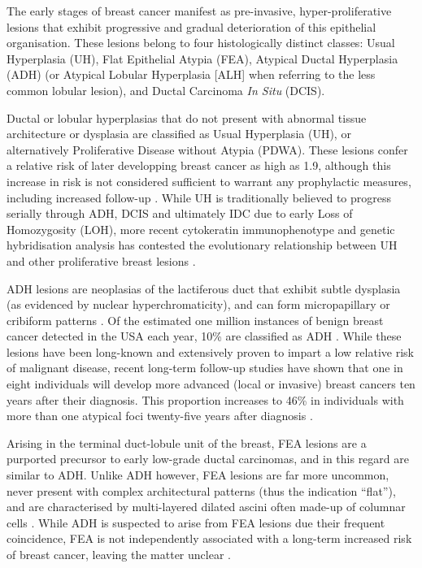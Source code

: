 The early stages of breast cancer manifest as pre-invasive, hyper-proliferative lesions that exhibit progressive and gradual deterioration of this epithelial organisation. These lesions belong to four histologically distinct classes: Usual Hyperplasia (UH), Flat Epithelial Atypia (FEA), Atypical Ductal Hyperplasia (ADH) (or Atypical Lobular Hyperplasia [ALH] when referring to the less common lobular lesion), and Ductal Carcinoma {\it In Situ} (DCIS).\par

Ductal or lobular hyperplasias that do not present with abnormal tissue architecture or dysplasia are classified as Usual Hyperplasia (UH), or alternatively Proliferative Disease without Atypia (PDWA). These lesions confer a relative risk of later developping breast cancer as high as 1.9, although this increase in risk is not considered sufficient to warrant any prophylactic measures, including increased follow-up \citep{mommers2001}. While UH is traditionally believed to progress serially through ADH, DCIS and ultimately IDC due to early Loss of Homozygosity (LOH), more recent cytokeratin immunophenotype and genetic hybridisation analysis has contested the evolutionary relationship between UH and other proliferative breast lesions \citep{oconnell1994, boecker2002}.\par

ADH lesions are neoplasias of the lactiferous duct that exhibit subtle dysplasia (as evidenced by nuclear hyperchromaticity), and can form micropapillary or cribiform patterns \citep{page1959,dion2016}. Of the estimated one million instances of benign breast cancer detected in the USA each  year, 10\% are classified as ADH \citep{simpson2009}. While  these lesions have been long-known and extensively proven to impart a low relative risk of malignant disease, recent long-term follow-up studies have shown that one in eight individuals will develop more advanced (local or invasive) breast cancers ten years after their diagnosis. This proportion increases to 46\% in individuals with more than one atypical foci twenty-five years after diagnosis \citep{hartmann2015}.\par

Arising in the terminal duct-lobule unit of the breast, FEA lesions are a purported precursor to early low-grade ductal carcinomas, and in this regard are similar to ADH. Unlike ADH however, FEA lesions are far more uncommon, never present with complex architectural patterns (thus the indication ``flat''), and are characterised by multi-layered dilated ascini often made-up of columnar cells \citep{pinder2017}. While ADH is suspected to arise from FEA lesions due their frequent coincidence, FEA is not independently associated with a long-term increased risk of breast cancer, leaving the matter unclear \citep{bombonati2011,lerwill2008,acott2016}.

